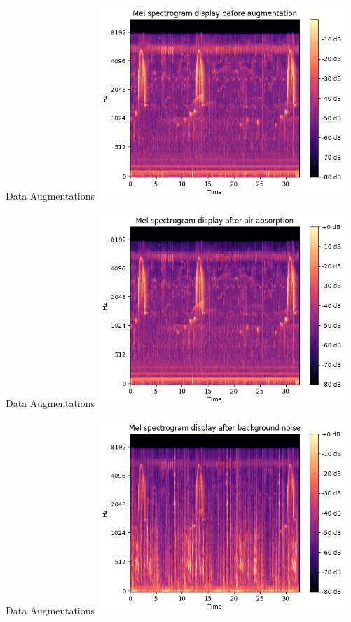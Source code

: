 \begin{frame}{Data Augmentations}
    \centering
    \includegraphics[height=0.7\textheight,width=0.7\textwidth,keepaspectratio]{images/before_aug.png}
\end{frame}

\begin{frame}{Data Augmentations}
    \centering
    \includegraphics[height=0.7\textheight,width=0.7\textwidth,keepaspectratio]{images/airabsorption.png}
\end{frame}

\begin{frame}{Data Augmentations}
    \centering
    \includegraphics[height=0.7\textheight,width=0.7\textwidth,keepaspectratio]{images/backgroundNoise.png}
\end{frame}

